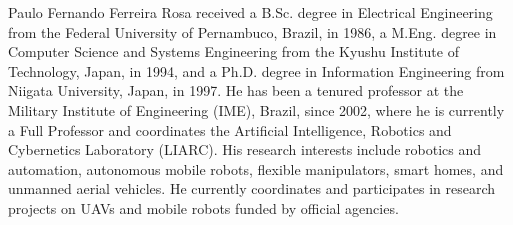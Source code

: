 \documentclass{ieeeaccess}
\begin{document}
\begin{IEEEbiographynophoto}{Paulo Fernando Ferreira Rosa} received a B.Sc. degree in Electrical Engineering from the Federal University of Pernambuco, Brazil, in 1986, a M.Eng. degree in Computer Science and Systems Engineering from the Kyushu Institute of Technology, Japan, in 1994, and a Ph.D. degree in Information Engineering from Niigata University, Japan, in 1997. He has been a tenured professor at the Military Institute of Engineering (IME), Brazil, since 2002, where he is currently a Full Professor and coordinates the Artificial Intelligence, Robotics and Cybernetics Laboratory (LIARC). His research interests include robotics and automation, autonomous mobile robots, flexible manipulators, smart homes, and unmanned aerial vehicles. He currently coordinates and participates in research projects on UAVs and mobile robots funded by official agencies.
\end{IEEEbiographynophoto}

\EOD
\end{document}
